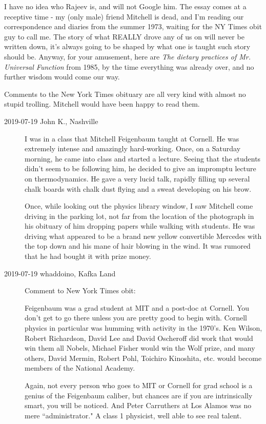 \begin{description}
I have no idea who Rajeev is, and will not Google him. The essay comes at
a receptive time - my (only male) friend Mitchell is dead, and I'm
reading our correspondence and diaries from the summer 1973, waiting for
the NY Times obit guy to call me. The story of what REALLY drove any of
us on will never be written down, it's always going to be shaped by what
one is taught such story should be. Anyway, for your amusement, here
are
{\em The dietary practices of Mr. Universal Function}
from 1985, by the time everything was already over, and no further wisdom
would come our way.

\end{description}
\bigskip

\noindent
Comments to the New York Times
{obituary} are all very kind with almost no stupid trolling. Mitchell
would have been happy to read them.

\begin{description}
\item[2019-07-19 John K., Nashville]
I was in a class that Mitchell Feigenbaum taught at Cornell.  He was
extremely intense and amazingly hard-working.  Once, on a Saturday
morning, he came into class and started a lecture.  Seeing that the
students didn't seem to be following him, he decided to give an impromptu
lecture on thermodynamics.  He gave a very lucid talk, rapidly filling up
several chalk boards with chalk dust flying and a sweat developing on his
brow.

Once, while looking out the physics library window, I saw Mitchell come
driving in the parking lot, not far from the location of the photograph
in his obituary of him dropping papers while walking with students.  He
was driving what appeared to be a brand new yellow convertible Mercedes
with the top down and his mane of hair blowing in the wind.  It was
rumored that he had bought it with prize money.

\item[2019-07-19 whaddoino, Kafka Land]
Comment to New York Times obit:

Feigenbaum was a grad student at MIT and a post-doc at Cornell. You don't
get to go there unless you are pretty good to begin with. Cornell physics
in particular was humming with activity in the 1970's. Ken Wilson, Robert
Richardson, David Lee and David Oscheroff did work that would win them
all Nobels, Michael Fisher would win the Wolf prize, and many others,
David Mermin, Robert Pohl, Toichiro Kinoshita, etc. would become members
of the National Academy.

Again, not every person who goes to MIT or Cornell for grad school is a
genius of the Feigenbaum caliber, but chances are if you are
intrinsically smart, you will be noticed. And Peter Carruthers at Los
Alamos was no mere ``administrator." A class 1 physicist, well able to
see real talent.

\end{description}

